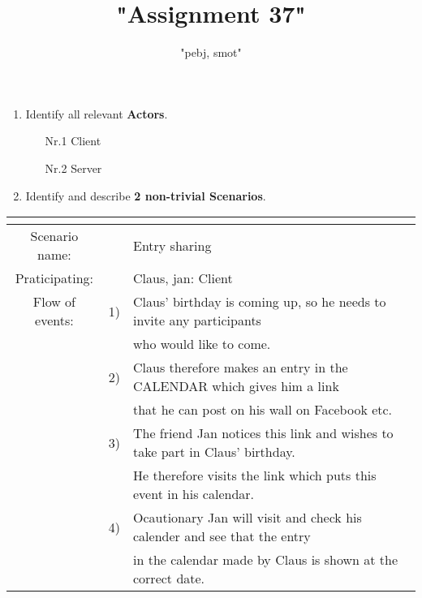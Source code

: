 \documentclass{article}
\begin{document}
	\title{"Assignment 37"}
	\author{"pebj, smot"}
	\maketitle

	\begin{enumerate}
		\item Identify all relevant \textbf{Actors}.
		\begin{enumerate}
			\item[Nr.1] Client
			\item[Nr.2] Server
		\end{enumerate}
		\item Identify and describe \textbf{2 non-trivial Scenarios}.
	\end{enumerate}

\begin{tabular}{c r @{} l}
	\multicolumn{2}{c}{} \\
	\hline
	Scenario name:	&&Entry sharing\\
	\hline
	Praticipating:		&&Claus, jan: Client \\
	\hline
	Flow of events:	&1)&Claus' birthday is coming up, so he needs to invite any participants\\ 
					&&who would like to come.\\
				&2)&Claus therefore makes an entry in the CALENDAR which gives him a link\\ 
					&&that he can post on his wall on Facebook etc.\\
				&3)&The friend Jan notices this link and wishes to take part in Claus' birthday.\\ 
					&&He therefore visits the link which puts this event in his calendar.\\
				&4)&Ocautionary Jan will visit and check his calender and see that the entry\\ 
					&&in the calendar made by Claus is shown at the correct date. \\
	\hline
\end{tabular}
\\
\end{document}
